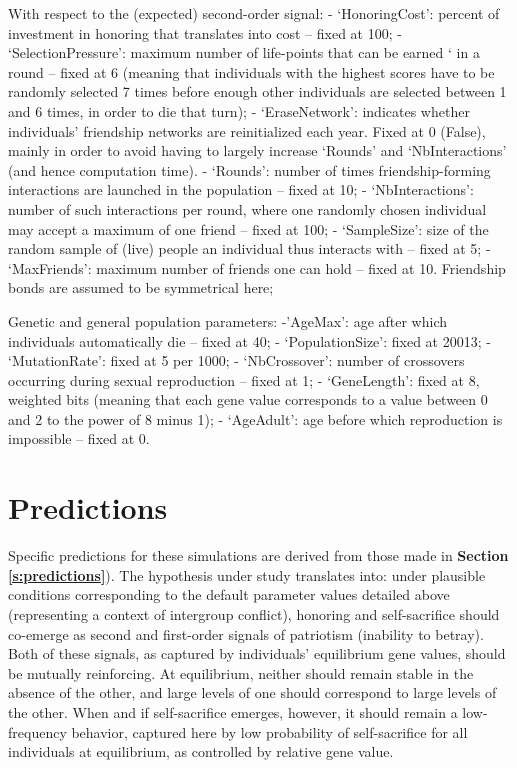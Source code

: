 \documentclass[a4paper,12pt]{report}
\begin{document}
With respect to the (expected) second-order signal:
	- ‘HonoringCost’: percent of investment in honoring that translates into 	cost – fixed at 100;
	- ‘SelectionPressure’: maximum number of life-points that can be earned ‘	in a round – fixed at 6 (meaning that individuals with the highest scores 	have to be randomly selected 7 times before enough other individuals 	are selected between 1 and 6 times, in order to die that turn);
	 - ‘EraseNetwork’: indicates whether individuals’ friendship networks 	are reinitialized each year. Fixed at 0 (False), mainly in order to avoid 	having to largely increase ‘Rounds’ and ‘NbInteractions’ (and hence 	computation time).
	- ‘Rounds’: number of times friendship-forming interactions are 	launched in the population – fixed at 10;
	- ‘NbInteractions’: number of such interactions per round, where one 	randomly chosen individual may accept a maximum of one friend – fixed 	at 100;
	- ‘SampleSize’: size of the random sample of (live) people an individual 	thus interacts with – fixed at 5;
	- ‘MaxFriends’: maximum number of friends one can hold – fixed at 10. 	Friendship bonds are assumed to be symmetrical here;

Genetic and general population parameters:
	-’AgeMax’: age after which individuals automatically die – fixed at 40;
	- ‘PopulationSize’: fixed at 20013;
	- ‘MutationRate’: fixed at 5 per 1000;
	- ‘NbCrossover’: number of crossovers occurring during sexual 	reproduction – fixed at 1;
	- ‘GeneLength’: fixed at 8, weighted bits (meaning that each gene value 	corresponds to a value between 0 and 2 to the power of 8 minus 1);
	- ‘AgeAdult’: age before which reproduction is impossible – fixed at 0.

\section{Predictions}
Specific predictions for these simulations are derived from those made in \textbf{Section \ref{s:predictions}}).
The hypothesis under study translates into: under plausible conditions corresponding
to the default parameter values detailed above (representing a context of intergroup conflict), honoring and self-sacrifice should co-emerge as second and first-order signals of patriotism (inability to betray). 
Both of these signals, as captured by individuals’ equilibrium gene values, should be mutually reinforcing. At equilibrium, neither should remain stable in the absence of the other, and large levels of one should correspond to large levels of the other.
When and if self-sacrifice emerges, however, it should remain a low-frequency behavior, captured here by low probability of self-sacrifice for all individuals at equilibrium, as controlled by relative gene value. 
\end{document}
